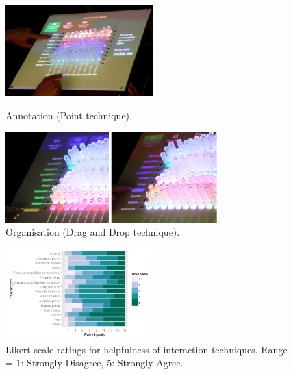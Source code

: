 \documentclass[12pt]{article}
\begin{document}
\begin{figure}[H]
\centering
  \includegraphics[height=3.5cm]{img/taher2015-annotation.png}
  \caption{Annotation (Point technique).}\label{fig:taher2015-annotation}
\endminipage\hfill
{}%
\centering
  \includegraphics[height=3.5cm]{img/taher2015-organize.png}
  \caption{Organisation (Drag and Drop technique).}\label{fig:taher2015-organize}
\endminipage
\end{figure}

\begin{figure}[H]
\centering
\includegraphics[width=0.5\textwidth]{img/taher2015-likert.png} 
\caption{Likert scale ratings for helpfulness of interaction
techniques. Range = 1: Strongly Disagree, 5: Strongly Agree.}\label{fig:taher2015-likert}
\end{figure}




\newpage

\end{document}
